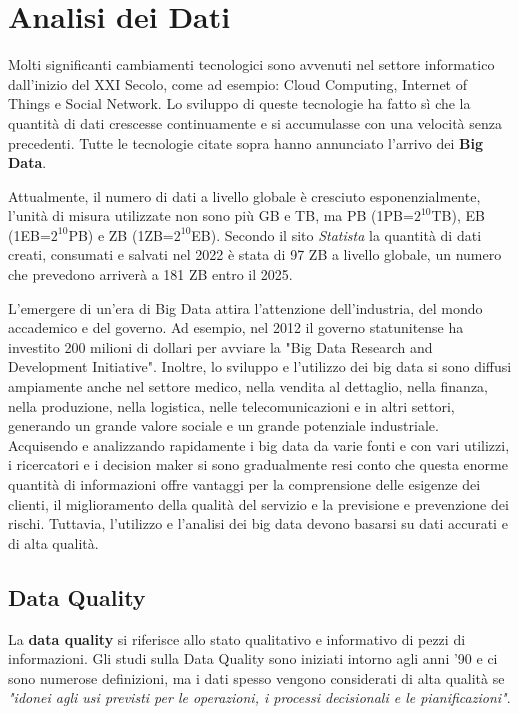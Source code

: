 \chapter{Analisi dei Dati}

Molti significanti cambiamenti tecnologici sono avvenuti nel settore informatico dall'inizio del XXI Secolo, come ad esempio: Cloud Computing, Internet of Things e Social Network. Lo sviluppo di queste tecnologie ha fatto sì che la quantità di dati crescesse continuamente e si accumulasse con una velocità senza precedenti. Tutte le tecnologie citate sopra  hanno annunciato l'arrivo dei \textbf{Big Data}\cite{meng2013big}.

Attualmente, il numero di dati a livello globale è cresciuto esponenzialmente, l'unità di misura utilizzate non sono più GB e TB, ma PB (1PB=$2^{10}$TB), EB (1EB=$2^{10}$PB) e ZB (1ZB=$2^{10}$EB).
Secondo il sito \textit{Statista} la quantità di dati creati, consumati e salvati nel 2022 è stata di 97 ZB a livello globale, un numero che prevedono arriverà a 181 ZB entro il 2025\cite{Statista}.

L'emergere di un'era di Big Data attira l'attenzione dell'industria, del mondo accademico e del governo. Ad esempio, nel 2012 il governo statunitense ha investito 200 milioni di dollari per avviare la "Big Data Research and Development Initiative"\cite{li2012research}. Inoltre, lo sviluppo e l'utilizzo dei big data si sono diffusi ampiamente anche nel settore medico, nella vendita al dettaglio, nella finanza, nella produzione, nella logistica, nelle telecomunicazioni e in altri settori, generando un grande valore sociale e un grande potenziale industriale\cite{feng2013research}.
Acquisendo e analizzando rapidamente i big data da varie fonti e con vari utilizzi, i ricercatori e i decision maker si sono gradualmente resi conto che questa enorme quantità di informazioni offre vantaggi per la comprensione delle esigenze dei clienti, il miglioramento della qualità del servizio e la previsione e prevenzione dei rischi. Tuttavia, l'utilizzo e l'analisi dei big data devono basarsi su dati accurati e di alta qualità\cite{cai2015challenges}.

\section{Data Quality}

La \textbf{data quality} si riferisce allo stato qualitativo e informativo di pezzi di informazioni. Gli studi sulla Data Quality sono iniziati intorno agli anni '90 e ci sono numerose definizioni, ma i dati spesso vengono considerati di alta qualità se \textit{"idonei agli usi previsti per le operazioni, i processi decisionali e le pianificazioni"}\cite{fadahunsi2019protocol,fadahunsi2021information,redman2008data}.

